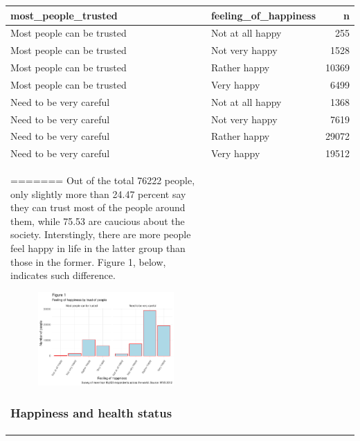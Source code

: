 \documentclass[man, fleqn, noextraspace,floatsintext]{apa6}
\begin{document}
\begin{tabular}{l|l|r}
\hline
most\_people\_trusted & feeling\_of\_happiness & n\\
\hline
Most people can be trusted & Not at all happy & 255\\
\hline
Most people can be trusted & Not very happy & 1528\\
\hline
Most people can be trusted & Rather happy & 10369\\
\hline
Most people can be trusted & Very happy & 6499\\
\hline
Need to be very careful & Not at all happy & 1368\\
\hline
Need to be very careful & Not very happy & 7619\\
\hline
Need to be very careful & Rather happy & 29072\\
\hline
Need to be very careful & Very happy & 19512\\
\hline
=======
Out of the total 76222 people, only slightly more than 24.47 percent say
they can trust most of the people around them, while 75.53 are caucious
about the society. Interstingly, there are more people feel happy in
life in the latter group than those in the former. Figure 1, below,
indicates such difference.

\begin{figure}
\centering
\includegraphics{610_final_files/figure-latex/unnamed-chunk-1-1.pdf}
\caption{}
\end{figure}

\subsubsection{Happiness and health
status}\label{happiness-and-health-status}


\end{tabular}
\end{document}
